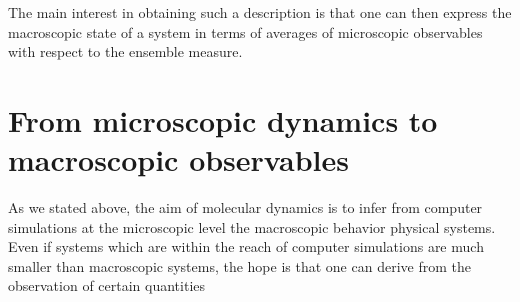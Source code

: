 The main interest in obtaining such a description is that one can then express the macroscopic state of a system in terms of averages of microscopic observables with respect to the ensemble measure.

\section{From microscopic dynamics to macroscopic observables}
As we stated above, the aim of molecular dynamics is to infer from computer simulations at the microscopic level the macroscopic behavior physical systems.
Even if systems which are within the reach of computer simulations are much smaller than macroscopic systems, the hope is that one can derive from the observation of certain quantities 